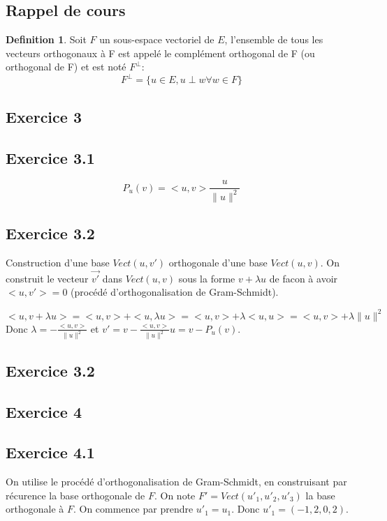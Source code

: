 \documentclass[]{book}
\theoremstyle{definition}
\newtheorem{defn}{Definition}
\newcommand{\vect}[1]{\overrightarrow{#1}}
\begin{document}
\subsection*{Rappel de cours}
\begin{defn}
    Soit $F$ un sous-espace vectoriel de $E$, l'ensemble de tous les vecteurs orthogonaux \`a F est appel\'e le compl\'ement orthogonal de F (ou orthogonal de F)
et est not\'e $F^{\perp}$:
$$
F^{\perp} = \{u \in E, u \perp w \forall w \in F\}
$$
\end{defn}


\newpage
\subsection*{Exercice 3}
\subsection*{Exercice 3.1}
$$
P_u(v) = <u,v>\frac{u}{\lVert u\rVert^2}
$$

\subsection*{Exercice 3.2}
Construction d'une base $Vect(u,v')$ orthogonale d'une base $Vect(u,v).$ On construit le vecteur $\vect{v'}$ dans $Vect(u, v)$ sous la forme $v+\lambda u$ de facon \`a avoir $<u,v'> = 0$ (proc\'ed\'e d’orthogonalisation
de Gram-Schmidt).

$$
<u,v+\lambda u> = <u,v> + <u,\lambda u> = <u,v> + \lambda<u,u> = <u,v> + \lambda\lVert u \rVert^2
$$
Donc $\lambda = -\frac{<u,v>}{\lVert u \rVert^2}$ et $v'= v -\frac{<u,v>}{\lVert u \rVert^2} u = v - P_u(v)$.

\subsection*{Exercice 3.2}


\subsection*{Exercice 4}
\subsection*{Exercice 4.1}
On utilise le proc\'ed\'e d’orthogonalisation de Gram-Schmidt, en construisant par r\'ecurence la base orthogonale de $F$. On note $F' = Vect(u'_1, u'_2, u'_3)$ la base orthogonale \`a $F$. On commence par prendre $u'_1 = u_1$. Donc $u'_1 = (-1, 2, 0, 2)$.
\end{document}
